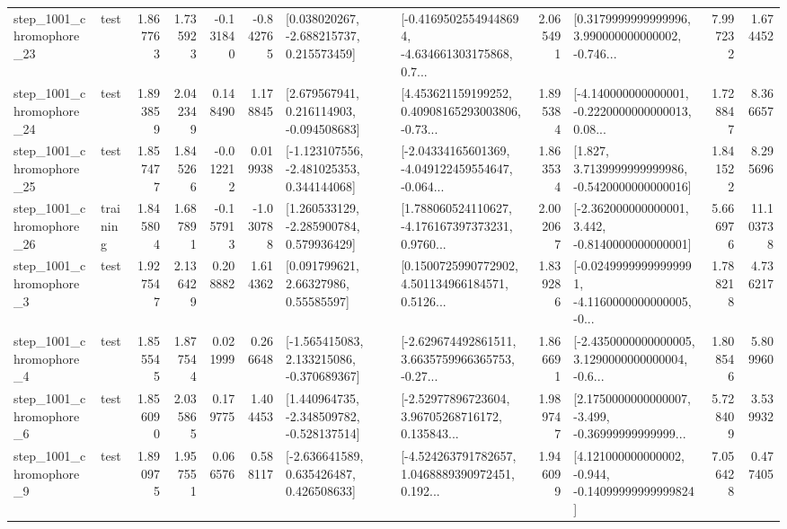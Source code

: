 \begin{tabular}{llrrrrllrlrr}
 step\_1001\_chromophore\_23 &      test &      1.867763 &    1.735923 &     -0.131840 & -0.842765 &    [0.038020267, -2.688215737, 0.215573459] &  [-0.41695025549448694, -4.634661303175868, 0.7... &       2.065491 &  [0.3179999999999996, 3.990000000000002, -0.746... &            7.997232 &          1.674452 \\
 step\_1001\_chromophore\_24 &      test &      1.893859 &    2.042349 &      0.148490 &  1.178845 &    [2.679567941, 0.216114903, -0.094508683] &  [4.453621159199252, 0.40908165293003806, -0.73... &       1.895384 &  [-4.140000000000001, -0.2220000000000013, 0.08... &            1.728847 &          8.366657 \\
 step\_1001\_chromophore\_25 &      test &      1.857477 &    1.845266 &     -0.012212 &  0.019938 &   [-1.123107556, -2.481025353, 0.344144068] &  [-2.04334165601369, -4.049122459554647, -0.064... &       1.863534 &   [1.827, 3.7139999999999986, -0.5420000000000016] &            1.841522 &          8.295696 \\
 step\_1001\_chromophore\_26 &  training &      1.845804 &    1.687891 &     -0.157913 & -1.030788 &    [1.260533129, -2.285900784, 0.579936429] &  [1.788060524110627, -4.176167397373231, 0.9760... &       2.002067 &   [-2.362000000000001, 3.442, -0.8140000000000001] &            5.666976 &         11.103738 \\
  step\_1001\_chromophore\_3 &      test &      1.927547 &    2.136429 &      0.208882 &  1.614362 &       [0.091799621, 2.66327986, 0.55585597] &  [0.1500725990772902, 4.501134966184571, 0.5126... &       1.839286 &  [-0.02499999999999991, -4.1160000000000005, -0... &            1.788218 &          4.736217 \\
  step\_1001\_chromophore\_4 &      test &      1.855545 &    1.877544 &      0.021999 &  0.266648 &   [-1.565415083, 2.133215086, -0.370689367] &  [-2.629674492861511, 3.6635759966365753, -0.27... &       1.866691 &  [-2.4350000000000005, 3.1290000000000004, -0.6... &            1.808546 &          5.809960 \\
  step\_1001\_chromophore\_6 &      test &      1.856090 &    2.035865 &      0.179775 &  1.404453 &   [1.440964735, -2.348509782, -0.528137514] &  [-2.52977896723604, 3.96705268716172, 0.135843... &       1.989747 &  [2.1750000000000007, -3.499, -0.36999999999999... &            5.728409 &          3.539932 \\
  step\_1001\_chromophore\_9 &      test &      1.890975 &    1.957551 &      0.066576 &  0.588117 &    [-2.636641589, 0.635426487, 0.426508633] &  [-4.524263791782657, 1.0468889390972451, 0.192... &       1.946099 &  [4.121000000000002, -0.944, -0.14099999999999824] &            7.056428 &          0.477405 \\

\end{tabular}
